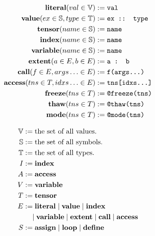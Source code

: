 \begin{figure}
\scriptsize
\noindent %
\begin{minipage}{0.4\linewidth}
\begin{align*}
    \text{\textbf{literal}}(val \in \mathbb{V}) &:= \text{\texttt{val}} \\
    \text{\textbf{value}}(ex \in \mathbb{S}, type \in \mathbb{T}) &:= \text{\texttt{ex :: type}} \\
    \text{\textbf{tensor}}(name \in \mathbb{S}) &:= \text{\texttt{name}} \\
    \text{\textbf{index}}(name \in \mathbb{S}) &:= \text{\texttt{name}} \\
    \text{\textbf{variable}}(name \in \mathbb{S}) &:= \text{\texttt{name}} \\
    \text{\textbf{extent}}(a \in E, b \in E) &:= \text{\texttt{a : b}} \\
    \text{\textbf{call}}(f \in E, args\ldots \in E) &:= \text{\texttt{f(args...)}} \\
    \text{\textbf{access}}(tns \in T, idxs\ldots \in E) &:= \text{\texttt{tns[idxs...]}} \\
    \text{\textbf{freeze}}(tns \in T) &:= \text{\texttt{@freeze(tns)}} \\
    \text{\textbf{thaw}}(tns \in T) &:= \text{\texttt{@thaw(tns)}} \\
    \text{\textbf{mode}}(tns \in T) &:= \text{\texttt{@mode(tns)}} \\
\end{align*}
\end{minipage}%
\begin{minipage}{0.5\linewidth}
\begin{align*}
    \mathbb{V} &:= \text{the set of all values.} \\
    \mathbb{S} &:= \text{the set of all symbols.} \\
    \mathbb{T} &:= \text{the set of all types.} \\
    I &:= \finchindex \\
    A &:= \finchaccess \\
    V &:= \finchvar \\
    T &:= \finchtensor \\
    E &:= \finchliteral \mid \finchvalue \mid \finchindex \\
        &\quad \mid \finchvar \mid \finchextent \mid \finchcall \mid \finchaccess \\
    S &:= \finchassign \mid \finchloop \mid \finchdefine \\

\end{align*}
\end{minipage}
\end{figure}
